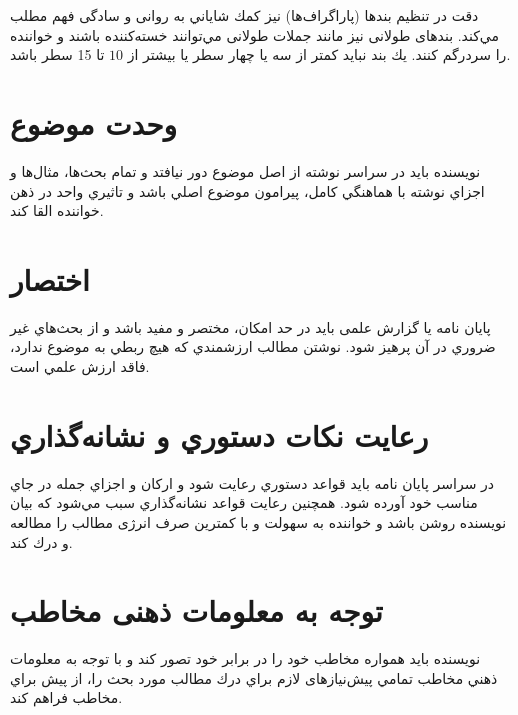 دقت در تنظیم بندها (پاراگراف‌ها) نيز كمك شاياني به روانی و سادگی فهم مطلب مي‌كند‌.‌ بندهای طولانی نيز مانند جملات طولانی مي‌توانند خسته‌كننده باشند و خواننده را سردرگم كنند‌.‌ يك بند نبايد کمتر از سه یا چهار سطر یا بيشتر از $10$ تا 15 سطر باشد.‌ 

\section{وحدت موضوع}

نویسنده بايد در سراسر نوشته از اصل موضوع دور نيافتد و تمام بحث‌ها، مثال‌ها و اجزاي نوشته با هماهنگي كامل، پيرامون موضوع اصلي باشد و تاثيري واحد در ذهن خواننده القا كند. 
\section{اختصار}

پایان نامه یا گزارش علمی بايد در حد امكان، مختصر و مفيد باشد و از بحث‌هاي غير ضروري در آن پرهيز شود. نوشتن مطالب ارزشمندي كه هيچ ربطي به موضوع ندارد، فاقد ارزش علمي است.
\section{رعایت نكات دستوري و نشانه‌گذاري}
در سراسر پایان نامه بايد قواعد دستوري رعايت شود و اركان و اجزاي جمله در جاي مناسب خود آورده شود. همچنین رعايت قواعد نشانه‌گذاري سبب مي‌شود كه بيان نويسنده روشن باشد و خواننده به سهولت و با کمترین صرف انرژی مطالب را مطالعه و درك كند.
\section{توجه به معلومات ذهنی مخاطب}
نويسنده بايد همواره مخاطب خود را در برابر خود تصور كند و با توجه به معلومات ذهني مخاطب  تمامي پیش‌نیازهای لازم براي درك مطالب مورد بحث را، از پیش براي مخاطب فراهم كند.

